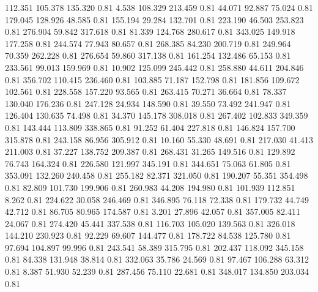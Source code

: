  112.351  105.378  135.320         0.81
   4.538  108.329  213.459         0.81
  44.071   92.887   75.024         0.81
 179.045  128.926   48.585         0.81
 155.194   29.284  132.701         0.81
 223.190   46.503  253.823         0.81
 276.904   59.842  317.618         0.81
  81.339  124.768  280.617         0.81
 343.025  149.918  177.258         0.81
 244.574   77.943   80.657         0.81
 268.385   84.230  200.719         0.81
 249.964   70.359  262.228         0.81
 276.654   59.860  317.138         0.81
 161.254  132.486   65.153         0.81
 233.561   99.013  159.969         0.81
  10.902  125.099  245.442         0.81
 258.880   44.611  204.846         0.81
 356.702  110.415  236.460         0.81
 103.885   71.187  152.798         0.81
 181.856  109.672  102.561         0.81
 228.558  157.220   93.565         0.81
 263.415   70.271   36.664         0.81
  78.337  130.040  176.236         0.81
 247.128   24.934  148.590         0.81
  39.550   73.492  241.947         0.81
 126.404  130.635   74.498         0.81
  34.370  145.178  308.018         0.81
 267.402  102.833  349.359         0.81
 143.444  113.809  338.865         0.81
  91.252   61.404  227.818         0.81
 146.824  157.700  315.878         0.81
 243.158   86.956  305.912         0.81
  10.160   55.330   48.691         0.81
 217.030   41.413  211.003         0.81
  37.227  138.752  209.387         0.81
 268.431   31.265  149.516         0.81
 129.892   76.743  164.324         0.81
 226.580  121.997  345.191         0.81
 344.651   75.063   61.805         0.81
 353.091  132.260  240.458         0.81
 255.182   82.371  321.050         0.81
 190.207   55.351  354.498         0.81
  82.809  101.730  199.906         0.81
 260.983   44.208  194.980         0.81
 101.939  112.851    8.262         0.81
 224.622   30.058  246.469         0.81
 346.895   76.118   72.338         0.81
 179.732   44.749   42.712         0.81
  86.705   80.965  174.587         0.81
   3.201   27.896   42.057         0.81
 357.005   82.411   24.067         0.81
 274.420   45.441  337.538         0.81
 116.703  105.020  139.563         0.81
 326.018  144.210  230.923         0.81
  92.229   69.607  144.477         0.81
 178.722   84.538  125.780         0.81
  97.694  104.897   99.996         0.81
 243.541   58.389  315.795         0.81
 202.437  118.092  345.158         0.81
  84.338  131.948   38.814         0.81
 332.063   35.786   24.569         0.81
  97.467  106.288   63.312         0.81
   8.387   51.930   52.239         0.81
 287.456   75.110   22.681         0.81
 348.017  134.850  203.034         0.81
